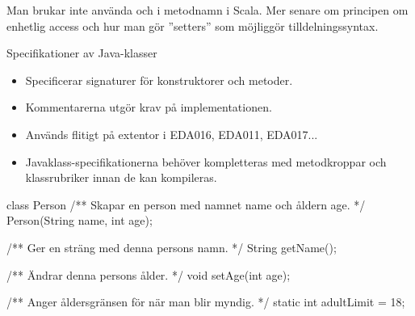 \ifkompendium
Man brukar inte använda  och  i metodnamn i Scala. Mer senare om principen om enhetlig access  och hur man gör ''setters'' som möjliggör tilldelningssyntax.
\fi


\begin{Slide}{Specifikationer av Java-klasser}
\begin{itemize}\small
\item Specificerar signaturer för konstruktorer och metoder. 
\item Kommentarerna utgör krav på implementationen.  
\item Används flitigt på extentor i EDA016, EDA011, EDA017...
\item Javaklass-specifikationerna behöver kompletteras med metodkroppar och klassrubriker innan de kan kompileras.
\end{itemize}
\begin{JavaSpec}{class Person}
/** Skapar en person med namnet name och åldern age. */
Person(String name, int age);

/** Ger en sträng med denna persons namn. */
String getName();

/** Ändrar denna persons ålder. */
void setAge(int age);

/** Anger åldersgränsen för när man blir myndig. */
static int adultLimit = 18;
\end{JavaSpec}
\end{Slide}









